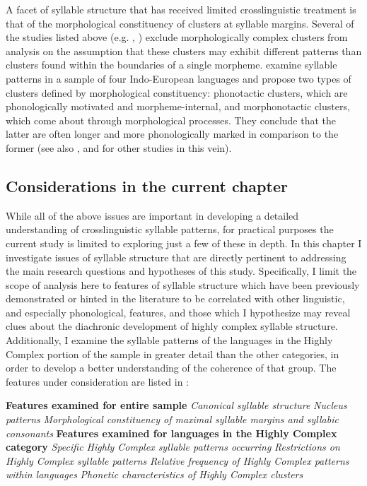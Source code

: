   A facet of syllable structure that has received limited crosslinguistic treatment is that of the morphological constituency of clusters at syllable margins. Several of the studies listed above (e.g. \citealt{Greenberg19651978}, \citealt{Morelli1999,Kreitman2008}) exclude morphologically complex clusters from analysis on the assumption that these clusters may exhibit different patterns than clusters found within the boundaries of a single morpheme. \citet{DresslerDziubalska-Kołaczyk2006} examine syllable patterns in a sample of four Indo-European languages and propose two types of clusters defined by morphological constituency: phonotactic clusters, which are phonologically motivated and morpheme-internal, and morphonotactic clusters, which come about through morphological processes. They conclude that the latter are often longer and more phonologically marked in comparison to the former (see also \citealt{DresslerEtAl2010,Orzechowska2012}, and \citealt{DresslerEtAl2015} for other studies in this vein).

\subsection{Considerations in the current chapter}\label{sec:3.1.2}

  While all of the above issues are important in developing a detailed understanding of crosslinguistic syllable patterns, for practical purposes the current study is limited to exploring just a few of these in depth. In this chapter I investigate issues of syllable structure that are directly pertinent to addressing the main research questions and hypotheses of this study. Specifically, I limit the scope of analysis here to features of syllable structure which have been previously demonstrated or hinted in the literature to be correlated with other linguistic, and especially phonological, features, and those which I hypothesize may reveal clues about the diachronic development of highly complex syllable structure. Additionally, I examine the syllable patterns of the languages in the Highly Complex portion of the sample in greater detail than the other categories, in order to develop a better understanding of the coherence of that group. The features under consideration are listed in :

\ea\label{ex:3.1}
   \textbf{Features examined for entire sample}
\ea   \textit{Canonical syllable structure}
\ex   \textit{Nucleus patterns}
\ex   \textit{Morphological constituency of maximal syllable margins and syllabic consonants}
\z
\z
\ea\label{ex:3.2}
   \textbf{Features examined for languages in the Highly Complex category}
\ea   \textit{Specific Highly Complex syllable patterns occurring}
\ex   \textit{Restrictions on Highly Complex syllable patterns}
\ex   \textit{Relative frequency of Highly Complex patterns within languages}
\ex   \textit{Phonetic characteristics of Highly Complex clusters}
\z
\z

